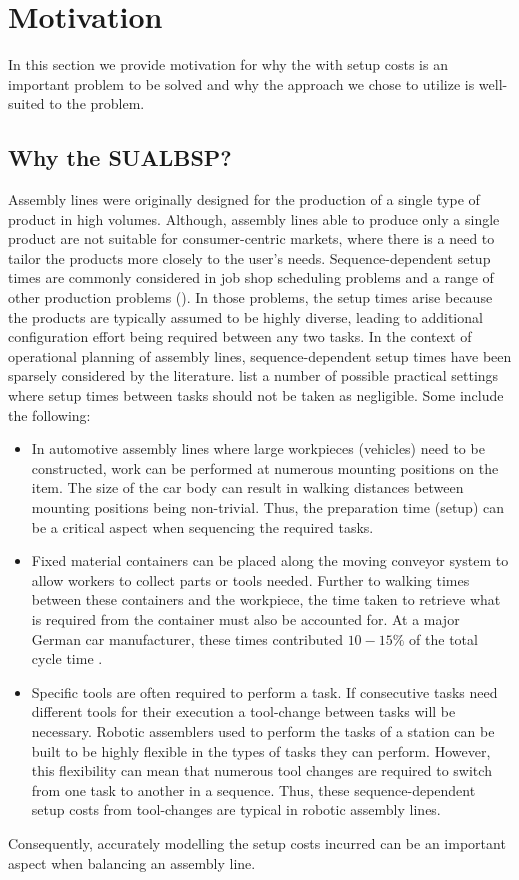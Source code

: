 \section{Motivation}
\label{sec:intro:motiv}
In this section we provide motivation for why the \albp{}
with setup costs
is an important problem to be solved and why the approach we
chose to utilize is well-suited to the problem.

\subsection{Why the SUALBSP?}
Assembly lines were originally designed for the production
of a single type of product in high volumes.
Although, assembly lines able to produce only a single
product are not suitable for consumer-centric markets, 
where there is a need to tailor the products
more closely to the user's needs.
Sequence-dependent setup times are commonly considered
in job shop scheduling problems and a range of other
production problems (\cf \cite{Allahverdi2008a,Allahverdi2008b,Allahverdi2015}).
In those problems, the setup times arise because the products
are typically assumed to be highly diverse,
leading to additional configuration effort being required
between any two tasks.
In the context of operational planning of assembly lines,
sequence-dependent setup times have been sparsely
considered by the literature.
 list a number of possible
practical settings where setup times between tasks should not
be taken as negligible. Some include the following:
\begin{itemize}
	\item In automotive assembly lines where large workpieces (vehicles)
	need to be constructed, work can be performed at numerous
	mounting positions on the item.
	The size of the car body can result in walking distances
	between mounting positions being non-trivial.
	Thus, the preparation time (setup) can 
	be a critical aspect when sequencing the required tasks.
	\item Fixed material containers can be placed along the moving 
	conveyor system to allow workers to collect parts or tools needed.
	Further to walking times between these containers and the workpiece,
	the time taken to retrieve what is required from the container
	must also be accounted for.
	At a major German car manufacturer, these times contributed $10-15\%$
	of the total cycle time \cite{Scholl2013}.
	\item Specific tools are often required to perform a task.
	If consecutive tasks need different tools for their
	execution a tool-change between tasks will be necessary.
	Robotic assemblers used to perform the tasks of a station
	can be built to be highly flexible in the types of tasks
	they can perform.
	However, this flexibility can mean that numerous tool changes
	are required to switch from one task to another
	in a sequence.
	Thus, these sequence-dependent setup costs from tool-changes
	are typical in robotic assembly lines.
\end{itemize}
Consequently, accurately modelling the setup costs incurred
can be an important aspect when balancing an assembly line.

